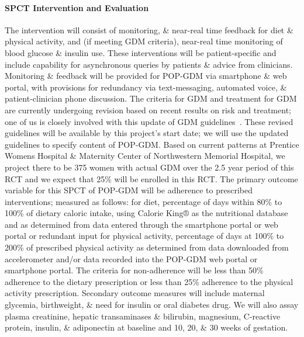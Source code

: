 \paragraph{SPCT Intervention and Evaluation} The
intervention will consist of monitoring, \& near-real time feedback
for diet \& physical activity, and (if meeting GDM criteria),
near-real time monitoring of blood glucose \& insulin use. These
interventions will be patient-specific and include capability for
asynchronous queries by patients \& advice from clinicians. Monitoring
\& feedback will be provided for POP-GDM via smartphone \& web portal,
with provisions for redundancy via text-messaging, automated voice, \&
patient-clinician phone discussion. The criteria for GDM and treatment
for GDM are currently undergoing revision based on recent results on
risk and treatment; one of us is closely involved with this update of
GDM guidelines~\citep{Metzger2010}. These revised guidelines will be
available by this project's start date; we will use the updated
guidelines to specify content of POP-GDM. Based on current patterns at
Prentice Womens Hospital \& Maternity Center of Northwestern Memorial
Hospital, we project there to be 375 women with actual GDM over the
2.5 year period of this RCT and we expect that 25\% will be enrolled
in this RCT. The primary outcome variable for this SPCT of POP-GDM will
be adherence to prescribed interventions; measured as follows: for
diet, percentage of days within 80\% to 100\% of dietary caloric
intake, using Calorie King® as the nutritional database and as
determined from data entered through the smartphone portal or web
portal or redundant input for physical activity, percentage of days at
100\% to 200\% of prescribed physical activity as determined from data
downloaded from accelerometer and/or data recorded into the POP-GDM
web portal or smartphone portal. The criteria for non-adherence will
be less than 50\% adherence to the dietary prescription or less than
25\% adherence to the physical activity prescription. Secondary
outcome measures will include maternal glycemia, birthweight, \& need
for insulin or oral diabetes drug. We will also assay plasma
creatinine, hepatic transaminases \& bilirubin, magnesium, C-reactive
protein, insulin, \& adiponectin at baseline and 10, 20, \& 30 weeks
of gestation.

